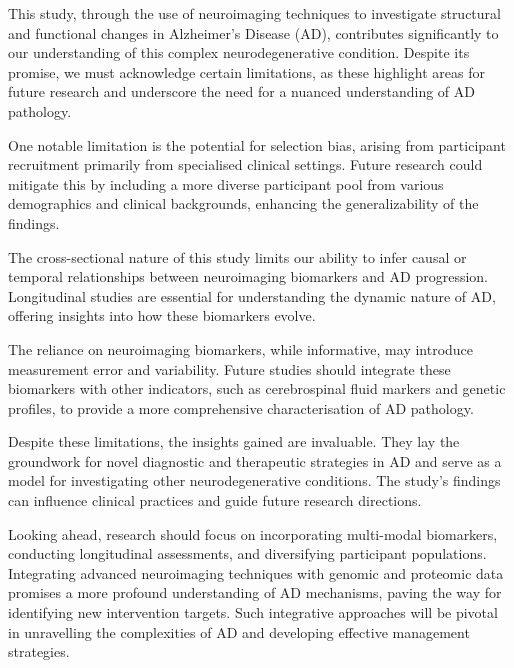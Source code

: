 \documentclass[10pt]{article}
\begin{document}
\begin{sloppypar}
  This study, through the use of neuroimaging techniques to investigate structural and functional changes in Alzheimer’s Disease (AD), contributes significantly to our understanding of this complex neurodegenerative condition. Despite its promise, we must acknowledge certain limitations, as these highlight areas for future research and underscore the need for a nuanced understanding of AD pathology.

  One notable limitation is the potential for selection bias, arising from participant recruitment primarily from specialised clinical settings. Future research could mitigate this by including a more diverse participant pool from various demographics and clinical backgrounds, enhancing the generalizability of the findings.

  The cross-sectional nature of this study limits our ability to infer causal or temporal relationships between neuroimaging biomarkers and AD progression. Longitudinal studies are essential for understanding the dynamic nature of AD, offering insights into how these biomarkers evolve.

  The reliance on neuroimaging biomarkers, while informative, may introduce measurement error and variability. Future studies should integrate these biomarkers with other indicators, such as cerebrospinal fluid markers and genetic profiles, to provide a more comprehensive characterisation of AD pathology.

  Despite these limitations, the insights gained are invaluable. They lay the groundwork for novel diagnostic and therapeutic strategies in AD and serve as a model for investigating other neurodegenerative conditions. The study’s findings can influence clinical practices and guide future research directions.

  Looking ahead, research should focus on incorporating multi-modal biomarkers, conducting longitudinal assessments, and diversifying participant populations. Integrating advanced neuroimaging techniques with genomic and proteomic data promises a more profound understanding of AD mechanisms, paving the way for identifying new intervention targets. Such integrative approaches will be pivotal in unravelling the complexities of AD and developing effective management strategies.

  \pagebreak
  \singlespacing %
  
  

\end{sloppypar}
\end{document}
